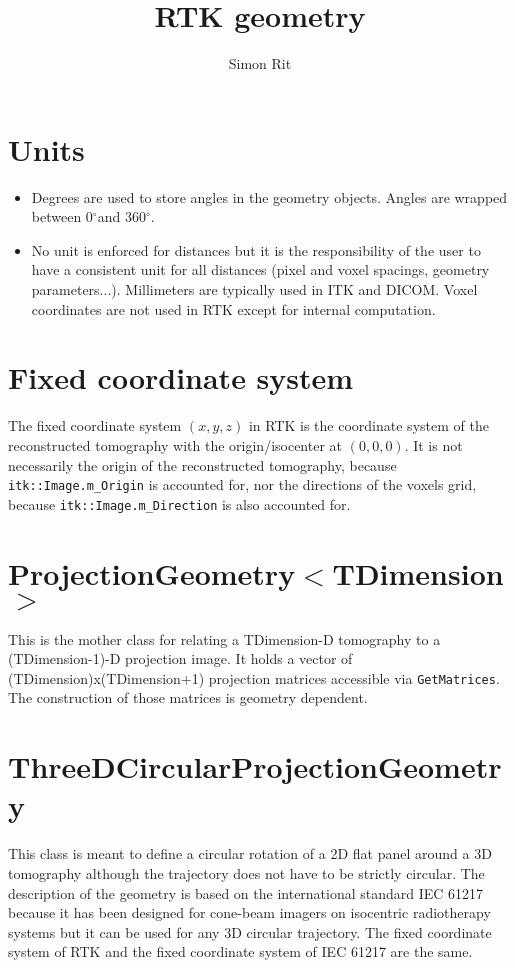 \documentclass{article}
\newcommand{\degree}{\ensuremath{^\circ}}
\begin{document}
\title{RTK geometry}
\author{Simon Rit}

\maketitle

\section{Units}

\begin{itemize}
 \item Degrees are used to store angles in the geometry objects. Angles are wrapped between 0\degree and 360\degree.
 \item No unit is enforced for distances but it is the responsibility of the user to have a consistent unit for all distances (pixel and voxel spacings, geometry parameters...). Millimeters are typically used in ITK and DICOM. Voxel coordinates are not used in RTK except for internal computation.
\end{itemize}

\section{Fixed coordinate system}

The fixed coordinate system $(x,y,z)$ in RTK is the coordinate system of the reconstructed tomography with the origin/isocenter at $(0,0,0)$. It is not necessarily the origin of the reconstructed tomography, because \verb+itk::Image.m_Origin+ is accounted for, nor the directions of the voxels grid, because \verb+itk::Image.m_Direction+ is also accounted for.

\section{ProjectionGeometry$<$TDimension$>$}

This is the mother class for relating a TDimension-D tomography to a (TDimension-1)-D projection image. It holds a vector of (TDimension)x(TDimension+1) projection matrices accessible via \verb+GetMatrices+. The construction of those matrices is geometry dependent.

\section{ThreeDCircularProjectionGeometry}

This class is meant to define a circular rotation of a 2D flat panel around a 3D tomography although the trajectory does not have to be strictly circular. The description of the geometry is based on the international standard IEC 61217 because it has been designed for cone-beam imagers on isocentric radiotherapy systems but it can be used for any 3D circular trajectory. The fixed coordinate system of RTK and the fixed coordinate system of IEC 61217 are the same.
\end{document}
